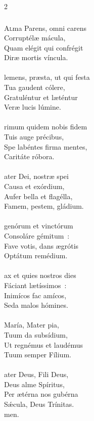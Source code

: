 \documentclass[9pt,twoside]{extarticle}
\begin{document}
\begin{multicols}{2}
\subsubsection*{\center {}}
\lettrine{A}lma Parens, omni carens\\
Corruptélæ mácula,\\
Quam elégit qui confrégit\\
Diræ mortis víncula.\\
\\
lemens, præsta, ut qui festa\\
Tua gaudent cólere,\\
Gratuléntur et læténtur\\
Veræ lucis lúmine.\\
\\
rimum quidem nobis fidem\\
Tuis auge précibus,\\
Spe labéntes firma mentes,\\
Caritáte róbora.\\
\\
ater Dei, nostræ spei\\
Causa et exórdium,\\
Aufer bella et flagélla,\\
Famem, pestem, gládium.\\
\\
genórum et vinctórum\\
Consoláre gémitum~:\\
Fave votis, dans ægrótis\\
Optátum remédium.\\
\\
ax et quies nostros dies\\
Fáciant lætíssimos~:\\
Inimícos fac amícos,\\
Seda malos hómines.\\
\\
 María, Mater pia,\\
Tuum da subsídium,\\
Ut regnémus et laudémus\\
Tuum semper Fílium.\\
\\
ater Deus, Fili Deus,\\
Deus alme Spíritus,\\
Per ætérna nos gubérna\\
Sǽcula, Deus Trínitas.\\
men.


\end{multicols}
\end{document}
